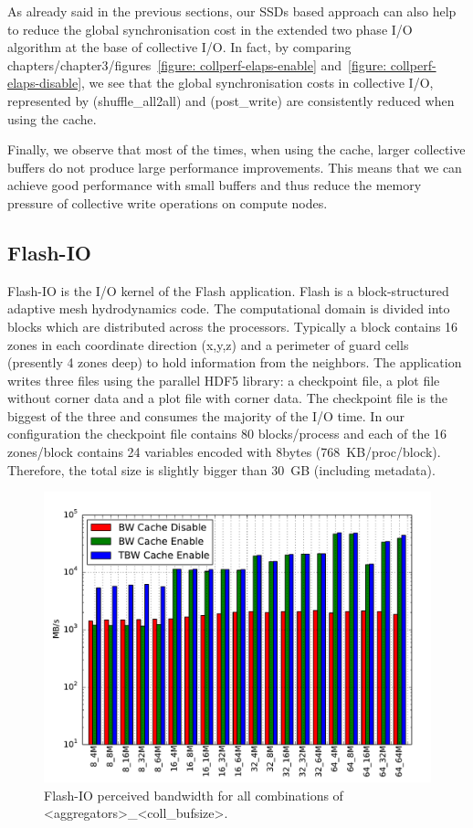 As already said in the previous sections, our SSDs based approach can also help to reduce the global synchronisation cost in the extended two phase I/O algorithm at the base of collective I/O.
In fact, by comparing chapters/chapter3/figures~\ref{figure: collperf-elaps-enable} and~\ref{figure: collperf-elaps-disable}, we see that the global synchronisation costs in collective I/O, represented by  (shuffle\_all2all) and  (post\_write) are consistently reduced when using the cache.

Finally, we observe that most of the times, when using the cache, larger collective buffers do not produce large performance improvements. This means that we can achieve good performance with small buffers and thus reduce the memory pressure of collective write operations on compute nodes.

\subsection{Flash-IO}
\label{subsec: flash}
Flash-IO is the I/O kernel of the Flash application. Flash is a block-structured adaptive mesh hydrodynamics code. The computational domain is divided into blocks which are distributed across the processors. Typically a block contains 16 zones in each coordinate direction (x,y,z) and a perimeter of guard cells (presently 4 zones deep) to hold information from the neighbors. The application writes three files using the parallel HDF5 library: a checkpoint file, a plot file without corner data and a plot file with corner data. The checkpoint file is the biggest of the three and consumes the majority of the I/O time. In our configuration the checkpoint file contains 80 blocks/process and each of the 16 zones/block contains 24 variables encoded with 8bytes (768~KB/proc/block). Therefore, the total size is slightly bigger than 30~GB (including metadata).

\begin{figure}[t!]
  \centering
  \includegraphics[width=0.95\columnwidth]{chapters/chapter3/figures/flash_32GB_30sec_bw}
  \caption{Flash-IO perceived bandwidth for all combinations of <aggregators>\_<coll\_bufsize>.} %
  \label{figure: flash-bw}
\end{figure}

